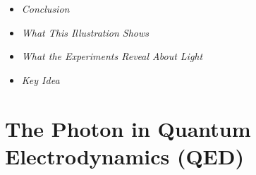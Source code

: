 \vspace{1em}
\begin{tcolorbox}[title=Reference Boxes,hinweisbox]
	\begin{itemize}
		\item \emph{Conclusion} \dotfill\pageref{box:fazit der photo}
		\item \emph{What This Illustration Shows} \dotfill\pageref{box:was diese Darstellun}
		\item \emph{What the Experiments Reveal About Light} \dotfill\pageref{box:was die Experimente}
	\end{itemize}
\end{tcolorbox}

\vspace{1em}
\begin{tcolorbox}[title=Hypothetical Boxes,hypobox]
	\begin{itemize}
		\item \emph{Key Idea} \dotfill\pageref{box:schlüsselidee}
	\end{itemize}
\end{tcolorbox}
\section{The Photon in Quantum Electrodynamics (QED)}

